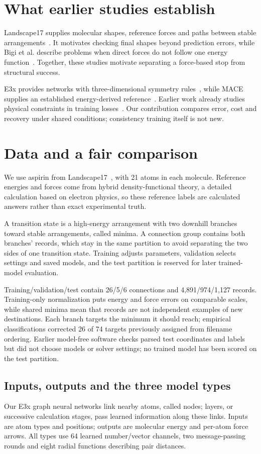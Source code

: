 \documentclass{article}
\begin{document}
\section{What earlier studies establish}
Landscape17 supplies molecular shapes, reference forces and paths between stable arrangements~\cite{landscape}. It motivates checking final shapes beyond prediction errors, while Bigi et al. describe problems when direct forces do not follow one energy function~\cite{bigi}. Together, these studies motivate separating a force-based stop from structural success.

E3x provides networks with three-dimensional symmetry rules~\cite{e3x}, while MACE supplies an established energy-derived reference~\cite{mace}. Earlier work already studies physical constraints in training losses~\cite{takamoto}. Our contribution compares error, cost and recovery under shared conditions; consistency training itself is not new.

\section{Data and a fair comparison}
We use aspirin from Landscape17~\cite{landscape}, with 21 atoms in each molecule. Reference energies and forces come from hybrid density-functional theory, a detailed calculation based on electron physics, so these reference labels are calculated answers rather than exact experimental truth.

A transition state is a high-energy arrangement with two downhill branches toward stable arrangements, called minima. A connection group contains both branches' records, which stay in the same partition to avoid separating the two sides of one transition state. Training adjusts parameters, validation selects settings and saved models, and the test partition is reserved for later trained-model evaluation.

Training/validation/test contain 26/5/6 connections and 4,891/974/1,127 records. Training-only normalization puts energy and force errors on comparable scales, while shared minima mean that records are not independent examples of new destinations. Each branch targets the minimum it should reach; empirical classifications corrected 26 of 74 targets previously assigned from filename ordering. Earlier model-free software checks parsed test coordinates and labels but did not choose models or solver settings; no trained model has been scored on the test partition.
\subsection{Inputs, outputs and the three model types}
Our E3x graph neural networks link nearby atoms, called nodes; layers, or successive calculation stages, pass learned information along these links. Inputs are atom types and positions; outputs are molecular energy and per-atom force arrows. All types use 64 learned number/vector channels, two message-passing rounds and eight radial functions describing pair distances.
\end{document}
